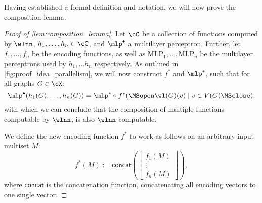 Having established a formal definition and notation, we will now prove the \wlnn composition lemma.
\begin{proof}[Proof of \cref{lem:composition_lemma}]
    Let $\cC$ be a collection of functions computed by $\wlnn$, $h_1, \dots ,h_n \in \cC$, and $\mlp^\bullet$ a multilayer perceptron. Further, let $f_{1}, \ldots, f_{n}$ be the encoding functions, as well as $\text{MLP}_1, \ldots, \text{MLP}_n$ be the multilayer perceptrons used by $h_1, \dots h_n$ respectively. As outlined in \cref{fig:proof_idea_parallelism}, we will now construct $f^*$ and $\mlp^*$, such that for all graphs $G \in \cX$:
    \begin{equation*}
        \mlp^\bullet(h_1(G), \dots ,h_n(G)) = \mlp^* \circ f^* (\MSopen \wl(G)(v) \mid v \in V(G) \MSclose),
    \end{equation*}
    with which we can conclude that the composition of multiple functions computable by $\wlnn$, is also $\wlnn$ computable. 

    We define the new encoding function $f^*$ to work as follows on an arbitrary input multiset $M$:
    \begin{equation*}
        f^*(M) := \textsf{concat}(
            \begin{bmatrix}
                f_1(M)\\
                \vdots\\
                f_n(M)
            \end{bmatrix}),
    \end{equation*}
    where $\textsf{concat}$ is the concatenation function, concatenating all encoding vectors to one single vector.


\end{proof}
